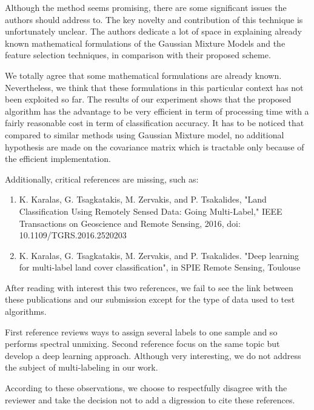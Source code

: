 \documentclass[a4paper,10pt,DIV=16]{scrartcl}
\begin{document}
\begin{revbox}
  Although the method seems promising, there are some significant issues the authors should address to. The key novelty and contribution of this technique is unfortunately unclear. The authors dedicate a lot of space in explaining already known mathematical formulations of the Gaussian Mixture Models and the feature selection techniques, in comparison with their proposed scheme.
  \begin{resbox}
    We totally agree that some mathematical formulations are already known. Nevertheless, we think that these formulations in this particular context has not been exploited so far. The results of our experiment shows that the proposed algorithm has the advantage to be very efficient in term of processing time with a fairly reasonable cost in term of classification accuracy. It has to be noticed that compared to similar methods using Gaussian Mixture model, no additional hypothesis are made on the covariance matrix which is tractable only because of the efficient implementation.
  \end{resbox}
\end{revbox}

\begin{revbox}
  Additionally, critical references are missing, such as:
  \begin{enumerate}
  \item K. Karalas, G. Tsagkatakis, M. Zervakis, and P. Tsakalides, "Land Classification Using Remotely Sensed Data: Going Multi-Label," IEEE Transactions on Geoscience and Remote Sensing, 2016, doi: 10.1109/TGRS.2016.2520203
  \item K. Karalas, G. Tsagkatakis, M. Zervakis, and P. Tsakalides. "Deep learning for multi-label land cover classification", in SPIE Remote Sensing, Toulouse
  \end{enumerate}

  \begin{resbox}
    After reading with interest this two references, we fail to see the link between these publications and our submission except for the type of data used to test algorithms.

    First reference reviews ways to assign several labels to one sample and so performs spectral unmixing. Second reference focus on the same topic but develop a deep learning approach. Although very interesting, we do not address the subject of multi-labeling in our work.

    According to these observations, we choose to respectfully disagree with the reviewer and take the decision not to add a digression to cite these references.
  \end{resbox}
\end{revbox}
\end{document}
